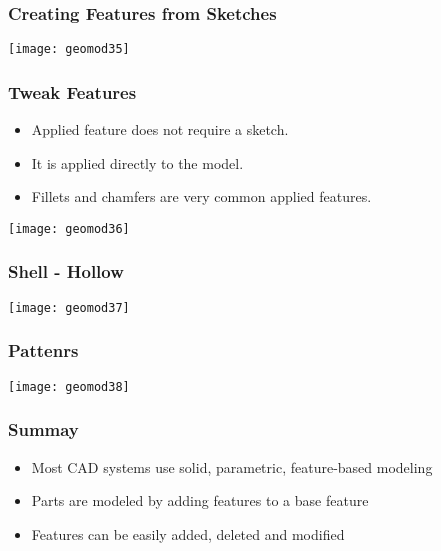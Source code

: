\begin{frame}[fragile]\frametitle{Creating Features from Sketches}

			\begin{center}
	\texttt{[image: geomod35]}
			\end{center}
\end{frame}

\begin{frame}[fragile]\frametitle{Tweak Features}

\begin{itemize}
\item Applied feature does not require a sketch.
\item It is applied directly to the model.
\item Fillets and chamfers are very common applied features.
\end{itemize}

			\begin{center}
	\texttt{[image: geomod36]}
			\end{center}
\end{frame}


\begin{frame}[fragile]\frametitle{Shell - Hollow}


			\begin{center}
	\texttt{[image: geomod37]}
			\end{center}
\end{frame}

\begin{frame}[fragile]\frametitle{Pattenrs}


			\begin{center}
	\texttt{[image: geomod38]}
			\end{center}
\end{frame}

\begin{frame}[fragile]\frametitle{Summay}

\begin{itemize}
\item Most CAD systems use solid, parametric, feature-based modeling
\item Parts are modeled by adding features to a base feature
\item Features can be easily added, deleted and modified
\end{itemize}
\end{frame}
